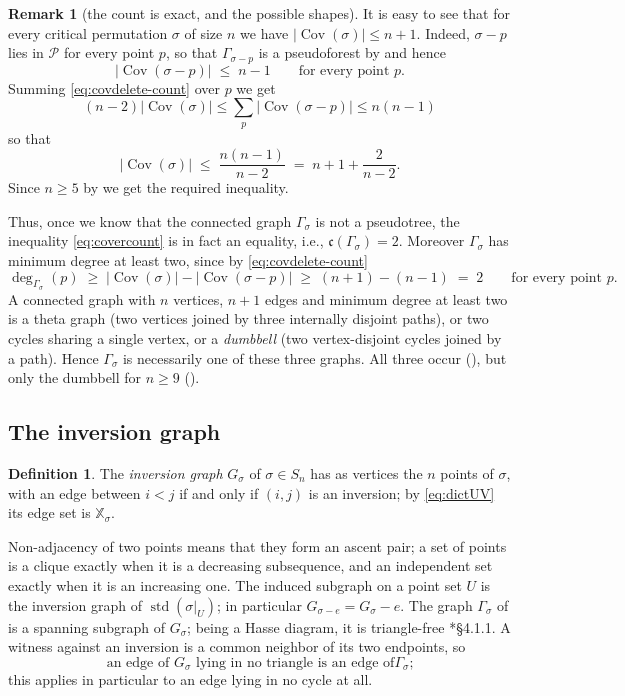 \documentclass[12pt]{article}
\def\xspace{ }%
\theoremstyle{definition}
\newtheorem{definition}[definition]{Definition}
\newtheorem{remark}[remark]{Remark}
\newcommand{\psm}{pseudosmooth\xspace}
\newcommand{\XX}{\mathbb{X}}  %
\newcommand{\PA}{\mathcal{P}}          %
\newcommand{\std}{\operatorname{std}}
\newcommand{\ptst}{U}                  %
\newcommand{\Cov}{\operatorname{Cov}}  %
\newcommand{\cyc}{\mathfrak{c}}            %
\newcommand{\cgr}{\Gamma}                 %
\newcommand{\igr}{G}                      %
\begin{document}
\begin{remark}[the count is exact, and the possible shapes]\label{rem:covexact}
It is easy to see that for every critical permutation $\sigma$ of size $n$ we have $|\Cov(\sigma)|\le n+1$.
Indeed, $\sigma - p$ lies in $\PA$ for every point
$p$, so that $\cgr_{\sigma-p}$ is a pseudoforest by  and hence
\[
   |\Cov(\sigma - p)| \;\le\; n-1 \qquad\text{for every point } p .
\]
Summing \eqref{eq:covdelete-count} over $p$ we get
\[
(n-2) |\Cov(\sigma)| \le\sum_p |\Cov(\sigma - p)| \le n(n-1)
\]
so that
\[
   |\Cov(\sigma)| \;\le\; \frac{n(n-1)}{n-2} \;=\; n+1+\frac{2}{n-2} .
\]
Since $n \ge 5$ by  we get the required inequality.

Thus, once we know that the connected graph $\cgr_\sigma$ is not a pseudotree, the inequality \eqref{eq:covercount} is in fact an
equality, i.e., $\cyc(\cgr_\sigma) = 2$. Moreover $\cgr_\sigma$ has minimum degree at least two, since by
\eqref{eq:covdelete-count}
\[
   \deg_{\cgr_\sigma}(p) \;\ge\; |\Cov(\sigma)| - |\Cov(\sigma - p)|
   \;\ge\; (n+1) - (n-1) \;=\; 2
   \qquad\text{for every point } p .
\]
A connected graph with $n$ vertices, $n+1$ edges and minimum degree at
least two is a theta graph (two vertices joined by three internally
disjoint paths), or two cycles sharing a single vertex, or a
\emph{dumbbell} (two vertex-disjoint cycles joined by a path). Hence
$\cgr_\sigma$ is necessarily one of these three graphs. All three occur
(), but only the dumbbell for $n \ge 9$ ().
\end{remark}


\subsection{The inversion graph}\label{ssec:invgraph}

\begin{definition}\label{def:invgraph}
The \emph{inversion graph} $\igr_\sigma$ of $\sigma \in S_n$ has as vertices
the $n$ points of $\sigma$, with an edge between $i < j$ if and only if
$(i,j)$ is an inversion; by \eqref{eq:dictUV} its edge set is
$\XX_\sigma$.
\end{definition}

Non-adjacency of two points means that they form an ascent pair; a set of
points is a clique exactly when it is a decreasing subsequence, and an
independent set exactly when it is an increasing one. The induced
subgraph on a point set $\ptst$ is the inversion graph of $\std(\sigma|_{\ptst})$;
in particular $\igr_{\sigma - e} = \igr_\sigma - e$. The graph $\cgr_\sigma$
of  is a spanning subgraph of $\igr_\sigma$; being a Hasse
diagram, it is triangle-free \cite{MR2376109}*{\S4.1.1}. A witness
against an inversion is a common neighbor of its two endpoints, so
\begin{equation}\label{eq:notriangle}
\text{an edge of $\igr_\sigma$ lying in no triangle is an edge of
$\cgr_\sigma$;}
\end{equation}
this applies in particular to an edge lying in no cycle at all.
\end{document}

